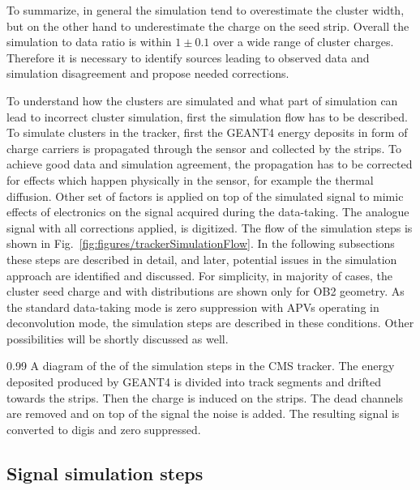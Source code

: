 To summarize, in general the simulation tend to overestimate the cluster width, but on the other hand to underestimate the charge on the seed strip. Overall the simulation to data ratio is within $1 \pm 0.1$ over a wide range of cluster charges.  Therefore it is necessary to identify sources leading to observed data and simulation disagreement and propose needed corrections.

To understand how the clusters are simulated and what part of simulation can lead to incorrect cluster simulation, first the simulation flow has to be described. To simulate clusters in the tracker, first the GEANT4 energy deposits in form of charge carriers is propagated through the sensor and collected by the strips. To achieve good data and simulation agreement, the propagation has to be corrected for effects which happen physically in the sensor, for example the thermal diffusion. Other set of factors is applied on top of the simulated signal to mimic effects of electronics on the signal acquired during the data-taking. The analogue signal with all corrections applied, is digitized. The flow of the simulation steps is shown in Fig.~\ref{fig:figures/trackerSimulationFlow}. In the following subsections these steps are described in detail, and later, potential issues in the simulation approach are identified and discussed. For simplicity, in majority of cases, the cluster seed charge and with distributions are shown only for OB2 geometry. As the standard data-taking mode is zero suppression with APVs operating in deconvolution mode, the simulation steps are described in these conditions. Other possibilities will be shortly discussed as well.

                 {0.99}       %
                 { A diagram of the of the simulation steps in the CMS tracker. The energy deposited produced by GEANT4 is divided into track segments and drifted towards the strips. Then the charge is induced on the strips. The dead channels are removed and on top of the signal the noise is added. The resulting signal is converted to digis and zero suppressed. }

\subsection{Signal simulation steps}


